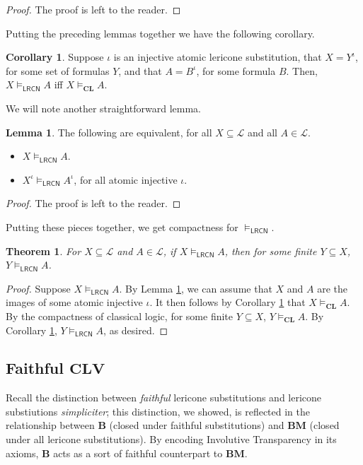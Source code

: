 \documentclass{amsart}
\newtheorem{theorem}{Theorem}
\theoremstyle{definition}
\newtheorem{lemma}{Lemma}
\newtheorem{cor}{Corollary}
\newcommand{\LL}{\mathcal{L}}
\newcommand{\LRCN}{\mathsf{LRCN}}
\newcommand{\CLV}{\mathbf{CLV}}
\newcommand{\logic}[1]{{\ensuremath {\mathbf{#1}}}}
\begin{document}
\begin{proof}
The proof is left to the reader.
\end{proof}
Putting the preceding lemmas together we have the following corollary. 
\begin{cor}\label{Cor:LRCNandCLequiv}
Suppose $\iota$ is an injective atomic lericone substitution, that $X=Y^\iota$, for some set of formulas $Y$, and that $A=B^\iota$, for some formula $B$.
Then,  $X\vDash_{\LRCN}A$ iff $X\vDash_{\logic{CL}} A$. 
\end{cor}
We will note another straightforward lemma. 
\begin{lemma}\label{Lemma:LRCNCOnClosure}
The following are equivalent, for all $X\subseteq\LL$ and all  $A\in\LL$. 
\begin{itemize}
\item $X\vDash_{\LRCN} A$.
\item $X^\iota\vDash_{\LRCN} A^\iota$, for all atomic injective $\iota$. 
\end{itemize}
\end{lemma}
\begin{proof}
The proof is left to the reader.
\end{proof}
Putting these pieces together, we get compactness for $\vDash_{\LRCN}$. 
\begin{theorem}
For $X\subseteq\LL$ and $A\in\LL$, if $X\vDash_{\LRCN}A$, then for some finite $Y\subseteq X$, $Y\vDash_{\LRCN}A$.
\end{theorem}
\begin{proof}
Suppose $X\vDash_{\LRCN}A$. By Lemma \ref{Lemma:LRCNCOnClosure}, we can assume that $X$ and $A$ are the images of some atomic injective $\iota$. 
It then follows by Corollary \ref{Cor:LRCNandCLequiv} that $X\vDash_{\logic{CL}}A$. By the compactness of classical logic, 
for some finite $Y\subseteq X$, $Y\vDash_{\logic{CL}}A$. By Corollary \ref{Cor:LRCNandCLequiv}, $Y\vDash_{\LRCN}A$, as desired. 
\end{proof}



\subsection{Faithful $\CLV$}

Recall the distinction between \emph{faithful} lericone substitutions and lericone substiutions \emph{simpliciter}; this distinction, we showed, is reflected in the relationship between $\mathbf{B}$ (closed under faithful substitutions) and $\mathbf{BM}$ (closed under all lericone substitutions). By encoding Involutive Transparency in its axioms, $\mathbf{B}$ acts as a sort of faithful counterpart to $\mathbf{BM}$.
\end{document}
